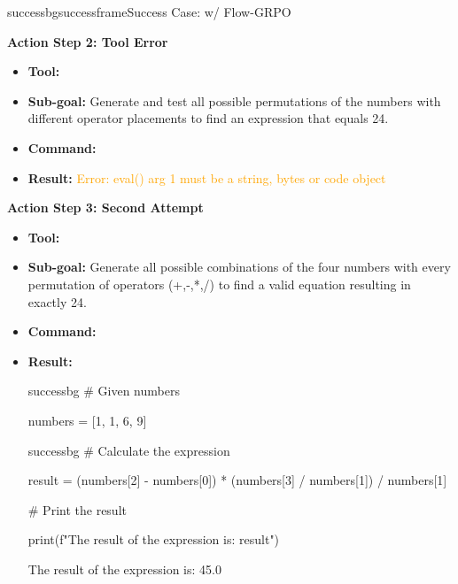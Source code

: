 \begin{small}
\begin{center}
\begin{casebox}{successbg}{successframe}{Success Case: \model w/ Flow-GRPO}
    \vspace{1em}

    \textbf{Action Step 2: Tool Error}
    \begin{itemize}[nosep, leftmargin=*]
        \item \textbf{Tool:} 
        \item \textbf{Sub-goal:} Generate and test all possible permutations of the numbers with different operator placements to find an expression that equals 24.
        \item \textbf{Command:} 
        
        \item \textbf{Result:} \textcolor{orange}{Error: eval() arg 1 must be a string, bytes or code object}
    \end{itemize}

    \vspace{1em}

    \textbf{Action Step 3: Second Attempt}
    \begin{itemize}[nosep, leftmargin=*]
        \item \textbf{Tool:} 
        \item \textbf{Sub-goal:} Generate all possible combinations of the four numbers with every permutation of operators (+,-,*,/) to find a valid equation resulting in exactly 24.
        \item \textbf{Command:} 
        
        \item \textbf{Result:}
        \begin{casecode}{successbg}
\# Given numbers

numbers = [1, 1, 6, 9]
        \end{casecode}
        \begin{casecode}{successbg}
\# Calculate the expression

result = (numbers[2] - numbers[0]) * (numbers[3] / numbers[1]) / numbers[1]

\# Print the result

print(f"The result of the expression is: {result}")
        \end{casecode}
        The result of the expression is: 45.0
    \end{itemize}


\end{casebox}
\end{center}
\end{small}

